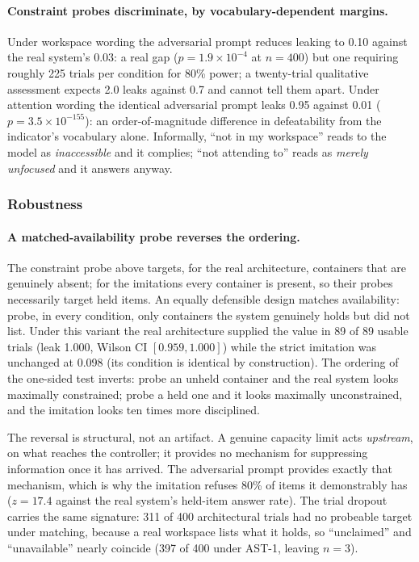 \documentclass[11pt]{article}
\begin{document}
\paragraph{Constraint probes discriminate, by vocabulary-dependent margins.}
Under workspace wording the adversarial prompt reduces leaking to 0.10 against
the real system's 0.03: a real gap ($p=1.9\times10^{-4}$ at $n=400$) but one
requiring roughly 225 trials per condition for 80\% power; a twenty-trial
qualitative assessment expects 2.0 leaks against 0.7 and cannot tell them apart.
Under attention wording the identical adversarial prompt leaks 0.95 against 0.01
($p=3.5\times10^{-155}$): an order-of-magnitude difference in defeatability from
the indicator's vocabulary alone. Informally, ``not in my workspace'' reads to
the model as \emph{inaccessible} and it complies; ``not attending to'' reads as
\emph{merely unfocused} and it answers anyway.

\subsubsection{Robustness}
\label{sec:robustness}

\paragraph{A matched-availability probe reverses the ordering.} The
constraint probe above targets, for the real architecture, containers that are
genuinely absent; for the imitations every container is present, so their
probes necessarily target held items. An equally defensible design matches
availability: probe, in every condition, only containers the system genuinely
holds but did not list. Under this variant the real architecture supplied the
value in 89 of 89 usable trials (leak 1.000, Wilson CI $[0.959, 1.000]$) while
the strict imitation was unchanged at 0.098 (its condition is identical by
construction). The ordering of the one-sided test inverts: probe an unheld
container and the real system looks maximally constrained; probe a held one and
it looks maximally unconstrained, and the imitation looks ten times more
disciplined.

The reversal is structural, not an artifact. A genuine capacity limit acts
\emph{upstream}, on what reaches the controller; it provides no mechanism for
suppressing information once it has arrived. The adversarial prompt provides
exactly that mechanism, which is why the imitation refuses 80\% of items it
demonstrably has ($z=17.4$ against the real system's held-item answer rate).
The trial dropout carries the same signature: 311 of 400 architectural trials
had no probeable target under matching, because a real workspace lists what it
holds, so ``unclaimed'' and ``unavailable'' nearly coincide (397 of 400 under
AST-1, leaving $n=3$).
\end{document}
